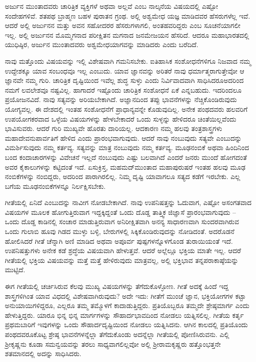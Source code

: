 ಅರ್ಜುನ ಮುಂತಾದವರು ಚಾರಿತ್ರಿಕ ವ್ಯಕ್ತಿಗಳೆ ಅಥವಾ ಅಲ್ಲವೆ ಎಂಬ ನಾಲ್ಕನೆಯ ವಿಷಯದಲ್ಲಿ ಎಷ್ಟೋ ಸಂದೇಹಗಳಿವೆ. ಶತಪಥ ಬ್ರಾಹ್ಮಣ ಬಹಳ ಪುರಾತನ ಗ್ರಂಥ. ಅಲ್ಲಿ ಅಶ್ವಮೇಧ ಯಜ್ಞ ಮಾಡಿದವರ ಹೆಸರುಗಳೆಲ್ಲ ಇವೆ. ಆದರೆ ಅಲ್ಲಿ ಅರ್ಜುನನ ಮತ್ತು ಅವನ ಸಹೋದರರ ಹೆಸರುಗಳಾಗಲಿ, ಅಂತಹವರಿದ್ದರು ಎಂಬ ಸೂಚನೆಯಾಗಲೀ ಇಲ್ಲ. ಅಲ್ಲಿ ಅರ್ಜುನನ ಮೊಮ್ಮಗನಾದ ಪರೀಕ್ಷಿತನ ಮಗನಾದ ಜನಮೇಜಯನ ಹೆಸರಿದೆ. ಆದರೂ ಮಹಾಭಾರತದಲ್ಲಿ ಯುಧಿಷ್ಠಿರ, ಅರ್ಜುನ ಮುಂತಾದವರು ಅಶ್ವಮೇಧಯಾಗವನ್ನು ಮಾಡಿದರು ಎಂದು ಬರೆದಿದೆ.

ನಾವು ಮತ್ತೊಂದು ವಿಷಯವನ್ನು ಇಲ್ಲಿ ವಿಶೇಷವಾಗಿ ಗಮನಿಸಬೇಕು. ಐತಿಹಾಸಿಕ ಸಂಶೋಧನೆಗಳಿಗೂ ನಿಜವಾದ ನಮ್ಮ ಉದ್ದೇಶಕ್ಕೂ ಯಾವ ಸಂಬಂಧವೂ ಇಲ್ಲ ಎಂಬುದು. ಯಾವ ಜ್ಞಾನವನ್ನು ಅರಿತರೆ ನಾವು ಧರ್ಮಾತ್ಮರಾಗುತ್ತೇವೋ ಆ ಜ್ಞಾನವೇ ನಮ್ಮ ಗುರಿ. ಚಾರಿತ್ರಿಕ ದೃಷ್ಟಿಯಿಂದ ಇವೆಲ್ಲ ಶುದ್ಧ ಸುಳ್ಳು ಎಂದು ನಿರ್ವಿವಾದವಾಗಿ ಸಾಧಿಸಿದರೂ\break ಅದರಿಂದ ನಮಗೆ ಲವಲೇಶವೂ ನಷ್ಟವಿಲ್ಲ. ಹಾಗಾದರೆ ಇಷ್ಟೊಂದು ಚಾರಿತ್ರಿಕ ಸಂಶೋಧನೆ ಏಕೆ ಎನ್ನಬಹುದು. ಇದರಿಂದಲೂ ಪ್ರಯೋಜನವಿದೆ. ನಾವು ಸತ್ಯವನ್ನು ಅರಿಯ\-ಬೇಕಾಗಿದೆ. ಅಜ್ಞಾನದಿಂದ ತಪ್ಪು ಭಾವನೆಗಳನ್ನು ನೆಚ್ಚಿಕೊಂಡಿರುವುದು ಯೋಗ್ಯವಲ್ಲ. ಈ ದೇಶದಲ್ಲಿ ಇಂತಹ ಸಂಶೋಧನೆಗೆ ಪ್ರಾಧಾನ್ಯವನ್ನೇ ಕೊಡುವುದಿಲ್ಲ. ಅನೇಕ ಪಂಥದವರು ಹಲವರಿಗೆ ಉಪಯೋಗಕರವಾದ ಒಳ್ಳೆಯ ವಿಷಯಗಳನ್ನು ಹೇಳಬೇಕಾದರೆ ಒಂದು ಸುಳ್ಳನ್ನು ಹೇಳಿದರೂ ಚಿಂತೆಯಿಲ್ಲವೆಂದು ಭಾವಿಸುವರು. ಆದರೆ ಗುರಿ ಮುಖ್ಯವೇ ಹೊರತು ದಾರಿಯಲ್ಲ. ಆದಕಾರಣ ನಮ್ಮ ಹಲವು ತಂತ್ರಶಾಸ್ತ್ರಗಳು ಮಹಾದೇವನು\break ಪಾರ್ವತಿಗೆ ಹೇಳಿದ ಎಂದು ಪ್ರಾರಂಭವಾಗುವುದು. ಆದರೆ ನಾವು ನಂಬುವುದು ಸತ್ಯವೇ ಎಂಬುದನ್ನು ವಿಮರ್ಶಿಸುವುದು ನಮ್ಮ ಕರ್ತವ್ಯ. ಸತ್ಯವನ್ನು ಮಾತ್ರ ನಂಬುವುದು ನಮ್ಮ ಕರ್ತವ್ಯ. ಮೂಢನಂಬಿಕೆ ಅಥವಾ ಹಿಂದಿನಿಂದ ಬಂದ ಕಂದಾಚಾರಗಳನ್ನು ವಿವೇಚನೆ ಇಲ್ಲದೆ ನಂಬುವುದು ಎಷ್ಟು ಬಲವಾಗಿದೆ ಎಂದರೆ ಜನರು ಮುಂದೆ ಹೋಗದಂತೆ ಅವರ ಕೈಕಾಲುಗಳನ್ನು ಕಟ್ಟಿದಂತೆ ಇದೆ. ಏಸುಕ್ರಿಸ್ತ, ಮಹಮದ್​ ಮುಂತಾದ ಮಹಾಪುರುಷರೆ ಇಂತಹ ಹಲವು ಮೂಢ ನಂಬಿಕೆ\-ಗಳನ್ನು ನಂಬಿದ್ದರು, ಅದರಿಂದ ಪಾರಾಗಿರಲಿಲ್ಲ. ನಿಮ್ಮ ದೃಷ್ಟಿ ಯಾವಾಗಲೂ ಸತ್ಯದ ಕಡೆಗೆ ಇರಬೇಕು. ಎಲ್ಲ ಬಗೆಯ ಮೂಢನಂಬಿಕೆಗಳನ್ನೂ ನಿರ್ಲಕ್ಷಿಸಬೇಕು.

ಗೀತೆಯಲ್ಲಿ ಏನಿದೆ ಎಂಬುದನ್ನು ನಾವೀಗ ನೋಡಬೇಕಾಗಿದೆ. ನಾವು ಉಪನಿಷತ್ತನ್ನು ಓದುವಾಗ, ಎಷ್ಟೋ ಅಸಂಗತವಾದ ವಿಷಯಗಳ ಮೂಲಕ ಹೋಗುತ್ತಿರುವಾಗ ಇದ್ದಕ್ಕಿದ್ದಂತೆ ಒಂದು ದೊಡ್ಡ ತಾತ್ತ್ವಿಕ ಜಿಜ್ಞಾಸೆ ಪ್ರಾರಂಭವಾಗುವುದು – ಒಂದು ದೊಡ್ಡ ಕಾಡಿನಲ್ಲಿ ಸಂಚಾರ ಮಾಡುತ್ತಿರುವಾಗ ಅನಿರೀಕ್ಷಿತವಾಗಿ ಅನನ್ಯ ಸಾಧಾರಣವಾಗಿ ಸುಂದರವಾಗಿರುವ ಒಂದು ಗುಲಾಬಿ ಹೂವು ಗಿಡದ ಮುಳ್ಳು ಬಳ್ಳಿ, ಬೇರುಗಳಲ್ಲಿ ಸಿಕ್ಕಿಕೊಂಡಿರುವುದನ್ನು ನೋಡಿದಂತೆ. ಅದರೊಡನೆ ಹೋಲಿಸಿದರೆ ಗೀತೆ ಚೆನ್ನಾಗಿ ಅಣಿ ಮಾಡಿದ ಅಥವಾ ಅಪೂರ್ವ ಪುಷ್ಪಗಳನ್ನೊಳಗೊಂಡ ತುರಾಯಿಯಂತೆ ಇದೆ. ಉಪನಿಷತ್ತುಗಳು ಅನೇಕ ಕಡೆ ಶ್ರದ್ಧೆಯ ವಿಷಯವಾಗಿ ಹೇಳುತ್ತವೆ. ಆದರೆ ಅಲ್ಲೆಲ್ಲೂ ಭಕ್ತಿಯ ಮಾತೇ ಇಲ್ಲ. ಆದರೆ ಗೀತೆಯಲ್ಲಿ ಭಕ್ತಿಯ ವಿಷಯವನ್ನು ಮತ್ತೆ ಮತ್ತೆ ಹೇಳಿರುವುದು ಮಾತ್ರವಲ್ಲ, ಅಲ್ಲಿ ಭಕ್ತಿಭಾವ ತನ್ನ\break ಪರಾಕಾಷ್ಠೆಯನ್ನು ಮುಟ್ಟಿದೆ.

ಈಗ ಗೀತೆಯಲ್ಲಿ ಚರ್ಚಿಸಿರುವ ಕೆಲವು ಮುಖ್ಯ ವಿಷಯಗಳನ್ನು ತೆಗೆದುಕೊಳ್ಳೋಣ. ಗೀತೆ ಅದಕ್ಕೆ ಹಿಂದೆ ಇದ್ದ ಶಾಸ್ತ್ರಗಳಿಗಿಂತ ಯಾವ ವಿಧದಲ್ಲಿ ವಿಶೇಷವಾಗಿರುವುದು? ಅದೇ ಇದು: ಗೀತೆಗೆ ಮುಂಚೆ ಜ್ಞಾನ, ಭಕ್ತಿಯೋಗಗಳ ಕಟ್ಟಾ ಅನುಯಾಯಿಗಳಿದ್ದರೂ, ಎಲ್ಲರೂ ತಮ್ಮ ತಮ್ಮೊಳಗೆ ಕಾದಾಡುತ್ತಿದ್ದರು. ಪ್ರತಿಯೊಬ್ಬರೂ ತಮ್ಮದೇ ಶ್ರೇಷ್ಠಮಾರ್ಗ ಎಂದು ಹೇಳುತ್ತಿದ್ದರು. ಯಾರೂ ಭಿನ್ನ ಭಿನ್ನ ಮಾರ್ಗಗಳನ್ನು ಸೌಹಾರ್ದಭಾವದಿಂದ ನೋಡಲು ಯತ್ನಿಸಲಿಲ್ಲ. ಗೀತೆಯ ಕರ್ತೃ ಪ್ರಥಮಬಾರಿಗೆ ಇವುಗಳನ್ನು ಒಂದು ಸೌಹಾರ್ದದೃಷ್ಟಿಯಿಂದ ನೋಡಲು ಯತ್ನಿಸಿದನು. ಆಗಿನ ಕಾಲದಲ್ಲಿ ಪ್ರತಿಯೊಂದು ಪಂಥದವರೂ\break ಕೊಟ್ಟ ಶ್ರೇಷ್ಠ ಭಾವನೆಗಳನ್ನೆಲ್ಲಾ ತೆಗೆದುಕೊಂಡು ಅದನ್ನೆಲ್ಲಾ ಗೀತೆಯಲ್ಲಿ ಪೋಣಿ\-ಸಿರುವನು. ಎಲ್ಲಿ ಶ‍್ರೀಕೃಷ್ಣನು ಕೂಡಾ ಸಮನ್ವಯವನ್ನು ತರಲು ಸಾಧ್ಯವಾಗಲಿಲ್ಲವೋ ಅಲ್ಲಿ ಶ‍್ರೀರಾಮಕೃಷ್ಣರು ಹತ್ತೊಂಭತ್ತನೇ ಶತಮಾನದಲ್ಲಿ ಅದನ್ನು ಸಾಧಿಸಿದರು.

